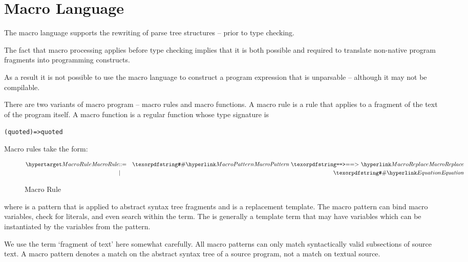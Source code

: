 \chapter{Macro Language}
\label{MacroLanguage}
The macro language supports the rewriting of parse tree structures -- prior to type checking.
\begin{aside}
The fact that macro processing applies before type checking implies that it is both possible and required to translate non-native \Sr program fragments into \Sr programming constructs.
\end{aside}

\begin{aside}
As a result it is not possible to use the macro  language to construct a program expression that is unparsable -- although it may not be compilable.
\end{aside}

There are two variants of macro program -- macro rules and macro functions. 
A macro rule is a rule that applies to a fragment of the text of the program itself. A macro function is a regular \Sr function whose type signature is 
\begin{alltt}
(quoted)=>quoted
\end{alltt}

Macro rules take the form:
\begin{figure}[htbp]
\begin{eqnarray*}
\ntDef{MacroRule}&\arrow&\q{\#}\ntRef{MacroPattern}\ \q{==>}\ \ntRef{MacroReplace}\\
&\choice&\q{\#} \ntRef{Equation}
\end{eqnarray*}
\caption{Macro Rule}
\label{macroRuleFig}
\end{figure}

\noindent
where  is a pattern that is applied to abstract syntax tree fragments and  is a replacement template. The macro pattern can bind macro variables, check for literals, and even search within the term. The  is generally a template term that may have variables which can be instantiated by the variables from the pattern.

\begin{aside}
We use the term `fragment of text' here somewhat carefully. All macro patterns can only match syntactically valid subsections of source text. A macro pattern denotes a match on the abstract syntax tree of a source program, not a match on textual source.
\end{aside}

